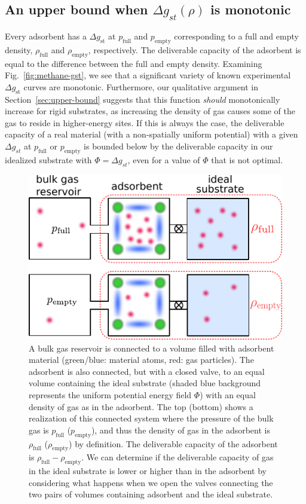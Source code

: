 \documentclass[twoside,twocolumn,9pt]{article}
\newcommand\V{\Phi}
\newcommand\pfull{\ensuremath{p_{\text{full}}}}
\newcommand\pempty{\ensuremath{p_{\text{empty}}}}
\newcommand\rhofull{\ensuremath{\rho_{\text{full}}}}
\newcommand\rhoempty{\ensuremath{\rho_{\text{empty}}}}
\newcommand\gst{\ensuremath{\Delta g_{st}}}
\begin{document}
\subsection{An upper bound when $\gst(\rho)$ is monotonic}\label{sec:monotonic}
Every adsorbent has a $\Delta g_\text{st}$ at $\pfull$ and $\pempty$ corresponding
to a full and empty density, $\rhofull$ and $\rhoempty$, respectively. The deliverable capacity of the adsorbent is equal to
the difference between the full and empty density. Examining
Fig.~\ref{fig:methane-gst}, we see that a significant variety of known
experimental $\Delta g_\text{st}$ curves are monotonic. Furthermore, our
qualitative argument in Section~\ref{sec:upper-bound} suggests that this
function \emph{should} monotonically increase for rigid substrates, as
increasing the density of gas causes some of the gas to reside in higher-energy
sites. If this is always the case, the deliverable capacity of a real material
(with a non-spatially uniform potential) with a given $\gst$ at $\pfull$ or
$\pempty$ is bounded below by the deliverable capacity in our idealized
substrate with $\V=\gst$, even for a value of $\V$ that is not optimal.

\begin{figure}
    \centering
    \includegraphics[width=0.95\columnwidth]{four-cases-pro}
    \caption{A bulk gas reservoir is connected to a volume filled with adsorbent material (green/blue: material atoms, red: gas particles). The adsorbent is also connected, but with a closed valve, to an equal volume containing the ideal substrate (shaded blue background represents the uniform potential energy field $\V$) with an equal density of gas as in the adsorbent. The top (bottom) shows a realization of this connected system where the pressure of the bulk gas is $\pfull$ ($\pempty$), and thus the density of gas in the adsorbent is $\rhofull$ ($\rhoempty$) by definition. The deliverable capacity of the adsorbent is $\rhofull - \rhoempty$. We can determine if the deliverable capacity of gas in the ideal substrate is lower or higher than in the adsorbent by considering what happens when we open the valves connecting the two pairs of volumes containing adsorbent and the ideal substrate.}
    \label{fig:delta-gst-maximum}
\end{figure}
    
\end{document}
